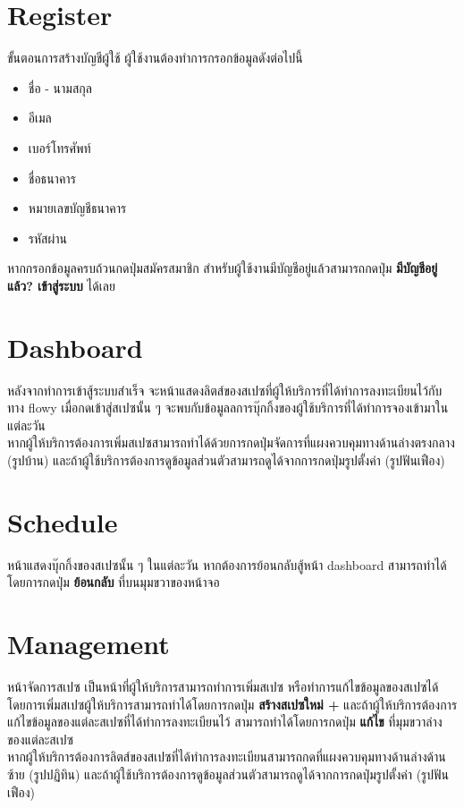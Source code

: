 \section{Register}
ขั้นตอนการสร้างบัญชีผู้ใช้ ผู้ใช้งานต้องทำการกรอกข้อมูลดังต่อไปนี้
\begin{itemize}
    \item ชื่อ - นามสกุล
    \item อีเมล
    \item เบอร์โทรศัพท์
    \item ชื่อธนาคาร
    \item หมายเลขบัญชีธนาคาร    
    \item รหัสผ่าน  
\end{itemize}
หากกรอกข้อมูลครบถ้วนกดปุ่มสมัครสมาชิก สำหรับผู้ใช้งานมีบัญชีอยู่แล้วสามารถกดปุ่ม \textbf{มีบัญชีอยู่แล้ว? เข้าสู่ระบบ} ได้เลย

\section{Dashboard}
หลังจากทำการเข้าสู้ระบบสำเร็จ จะหน้าแสดงลิตส์ของสเปซที่ผู้ให้บริการที่ได้ทำการลงทะเบียนไว้กับทาง flowy เมื่อกดเข้าสู่สเปซนั้น ๆ จะพบกับข้อมูลลการบุ๊กกิ้งของผู้ใช้บริการที่ได้ทำการจองเข้ามาในแต่ละวัน \\
หากผู้ให้บริการต้องการเพิ่มสเปซสามารถทำได้ด้วยการกดปุ่มจัดการที่แผงควบคุมทางด้านล่างตรงกลาง (รูปบ้าน) และถ้าผู้ใช้บริการต้องการดูข้อมูลส่วนตัวสามารถดูได้จากการกดปุ่มรูปตั้งค่า (รูปฟันเฟือง)

\section{Schedule}
หน้าแสดงบุ๊กกิ้งของสเปซนั้น ๆ ในแต่ละวัน หากต้องการย้อนกลับสู้หน้า dashboard สามารถทำได้โดยการกดปุ่ม \textbf{ย้อนกลับ} ที่บนมุมขวาของหน้าจอ

\section{Management}
หน้าจัดการสเปซ เป็นหน้าที่ผู้ให้บริการสามารถทำการเพิ่มสเปซ หรือทำการแก้ไขข้อมูลของสเปซได้ โดยการเพิ่มสเปซผู้ให้บริการสามารถทำได้โดยการกดปุ่ม \textbf{สร้างสเปซใหม่ +} และถ้าผู้ให้บริการต้องการแก้ไขข้อมูลของแต่ละสเปซที่ได้ทำการลงทะเบียนไว้ สามารถทำได้โดยการกดปุ่ม \textbf{แก้ไข} ที่มุมขวาล่างของแต่ละสเปซ \\
หากผู้ให้บริการต้องการลิตส์ของสเปซที่ได้ทำการลงทะเบียนสามารถกดที่แผงควบคุมทางด้านล่างด้านซ้าย (รูปปฏิทิน) และถ้าผู้ใช้บริการต้องการดูข้อมูลส่วนตัวสามารถดูได้จากการกดปุ่มรูปตั้งค่า (รูปฟันเฟือง)

